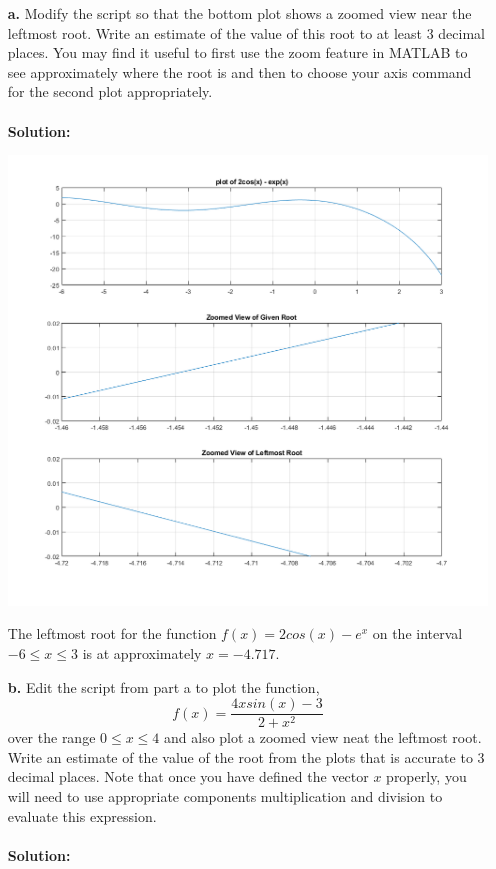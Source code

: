 \documentclass[12pt]{article}
\makeatletter
\theoremstyle{homework}
\newenvironment{exercise}[1]
{\def\@currentlabel{#1}\exercisecore}
{\endexercisecore}
\makeatother
\begin{document}
\begin{exercise}{5}
\begin{enumerate}
  \item [\textbf{a.}] Modify the script so that the bottom plot shows a zoomed view near the leftmost root. Write an estimate of the value of this root to at least 3 decimal places.
  You may find it useful to first use the zoom feature in MATLAB to see approximately where the root is and then to choose your axis command for the second plot appropriately.\\\\
  \textbf{Solution:} 
  \vspace{1in}
  
  \begin{center}
    \includegraphics[width=\textwidth]{plotfunction.png}
  \end{center}
  The leftmost root for the function $f(x) = 2cos(x) - e^{x}$ on the interval $-6 \le x \le 3$ is at approximately $x = -4.717$.




  \item [\textbf{b.}] Edit the script from part a to plot the function,
  \begin{equation*}
    f(x) = \frac{4x sin(x) - 3}{2 + x^2}
  \end{equation*}
  over the range $ 0 \le x \le 4$ and also plot a zoomed view neat the leftmost root.
   Write an estimate of the value of the root from the plots that is accurate to 3 decimal places.
  Note that once you have defined the vector $x$ properly, you will need to use appropriate components multiplication and division to evaluate this expression.\\\\
  \textbf{Solution:} 
  

\end{enumerate}
\end{exercise}
\end{document}
